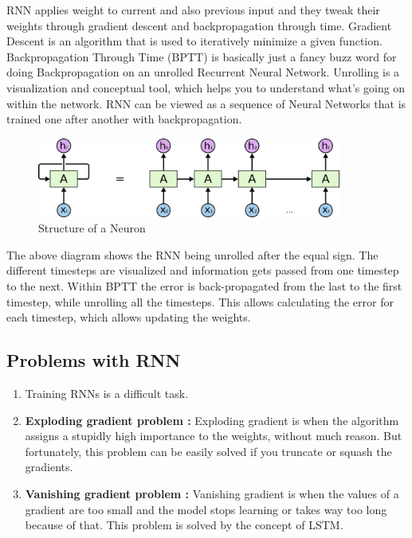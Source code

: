 RNN applies weight to current and also previous input and they tweak their
weights through gradient descent and backpropagation through time. Gradient
Descent is an algorithm that is used to iteratively minimize a given function.
Backpropagation Through Time (BPTT) is basically just a fancy buzz word for
doing Backpropagation on an unrolled Recurrent Neural Network. Unrolling is a
visualization and conceptual tool, which helps you to understand what’s going on
within the network. RNN can be viewed as a sequence of Neural Networks that is
trained one after another with backpropagation.

\begin{figure}
	\caption{Structure of a Neuron}
	\centering\includegraphics[width=10cm]{3.png}
\end{figure}

The above diagram shows the RNN being unrolled after the equal sign. The
different timesteps are visualized and information gets passed from one timestep
to the next. Within BPTT the error is back-propagated from the last to the first
timestep, while unrolling all the timesteps. This allows calculating the error
for each timestep, which allows updating the weights.

\subsection{Problems with RNN}

\begin{enumerate}[align=left]

	\item Training RNNs is a difficult task.

	\item \textbf{Exploding gradient problem :} Exploding gradient is when
		the algorithm assigns a stupidly high importance to the weights,
		without much reason. But fortunately, this problem can be easily
		solved if you truncate or squash the gradients.

	\item \textbf{Vanishing gradient problem :} Vanishing gradient is when
		the values of a gradient are too small and the model stops
		learning or takes way too long because of that. This problem is
		solved by the concept of LSTM.

\end{enumerate}

